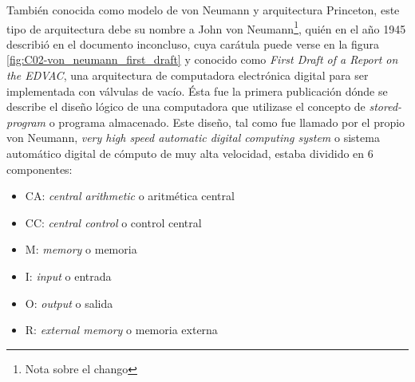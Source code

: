 También conocida como modelo de von Neumann y arquitectura Princeton, este tipo
de arquitectura debe su nombre a John von Neumann\footnote{Nota sobre el
chango}, quién en el año 1945 describió en el documento inconcluso, cuya
carátula puede verse en la figura \ref{fig:C02-von_neumann_first_draft} y
conocido como \emph{First Draft of a Report on the EDVAC}\cite{vonNeumann}, una
arquitectura de computadora electrónica digital para ser implementada con
válvulas de vacío. Ésta fue la primera publicación dónde se describe el diseño
lógico de una computadora que utilizase el concepto de \emph{stored-program} o
programa almacenado. Este diseño, tal como fue llamado por el propio von
Neumann, \emph{very high speed automatic digital computing system} o sistema
automático digital de cómputo de muy alta velocidad, estaba dividido en 6
componentes:
\begin{itemize}
  \item CA: \emph{central arithmetic} o aritmética central
  \item CC: \emph{central control} o control central
  \item M: \emph{memory} o memoria
  \item I: \emph{input} o entrada
  \item O: \emph{output} o salida
  \item R: \emph{external memory} o memoria externa
\end{itemize}
